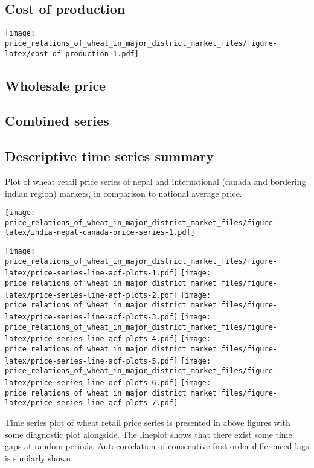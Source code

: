 \documentclass[
  12pt,
]{article}
\begin{document}
\hypertarget{cost-of-production}{%
\subsection{Cost of production}\label{cost-of-production}}

\texttt{[image: price\_relations\_of\_wheat\_in\_major\_district\_market\_files/figure-latex/cost-of-production-1.pdf]}

\hypertarget{wholesale-price}{%
\subsection{Wholesale price}\label{wholesale-price}}

\hypertarget{combined-series}{%
\subsection{Combined series}\label{combined-series}}

\hypertarget{descriptive-time-series-summary}{%
\subsection{Descriptive time series summary}\label{descriptive-time-series-summary}}

Plot of wheat retail price series of nepal and international (canada and bordering indian region) markets, in comparison to national average price.

\texttt{[image: price\_relations\_of\_wheat\_in\_major\_district\_market\_files/figure-latex/india-nepal-canada-price-series-1.pdf]}

\texttt{[image: price\_relations\_of\_wheat\_in\_major\_district\_market\_files/figure-latex/price-series-line-acf-plots-1.pdf]} \texttt{[image: price\_relations\_of\_wheat\_in\_major\_district\_market\_files/figure-latex/price-series-line-acf-plots-2.pdf]} \texttt{[image: price\_relations\_of\_wheat\_in\_major\_district\_market\_files/figure-latex/price-series-line-acf-plots-3.pdf]} \texttt{[image: price\_relations\_of\_wheat\_in\_major\_district\_market\_files/figure-latex/price-series-line-acf-plots-4.pdf]} \texttt{[image: price\_relations\_of\_wheat\_in\_major\_district\_market\_files/figure-latex/price-series-line-acf-plots-5.pdf]} \texttt{[image: price\_relations\_of\_wheat\_in\_major\_district\_market\_files/figure-latex/price-series-line-acf-plots-6.pdf]} \texttt{[image: price\_relations\_of\_wheat\_in\_major\_district\_market\_files/figure-latex/price-series-line-acf-plots-7.pdf]}

Time series plot of wheat retail price series is presented in above figures with some diagnostic plot alongside. The lineplot shows that there exist some time gaps at random periods. Autocorrelation of consecutive first order differenced lags is similarly shown.
\end{document}
